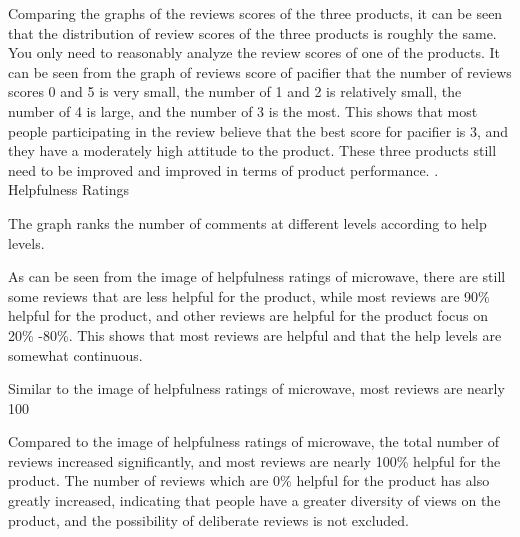 \documentclass[12pt]{article}
\begin{document}
\par
Comparing the graphs of the reviews scores of the three products, it can be seen that the distribution of review scores of the three products is roughly the same. You only need to reasonably analyze the review scores of one of the products. It can be seen from the graph of reviews score of pacifier that the number of reviews scores 0 and 5 is very small, the number of 1 and 2 is relatively small, the number of 4 is large, and the number of 3 is the most. This shows that most people participating in the review believe that the best score for pacifier is 3, and they have a moderately high attitude to the product. These three products still need to be improved and improved in terms of product performance.
. Helpfulness Ratings
\par
The graph ranks the number of comments at different levels according to help levels.
\par
As can be seen from the image of helpfulness ratings of microwave, there are still some reviews that are less helpful for the product, while most reviews are 90\% helpful for the product, and other reviews are helpful for the product focus on 20\% -80\%. This shows that most reviews are helpful and that the help levels are somewhat continuous.
\par
Similar to the image of helpfulness ratings of microwave, most reviews are nearly 100%
\par
\quad\par\quad\par\quad\par\quad\par\quad\par\quad\par\quad\par\quad\par\quad\par\quad\par
\par
Compared to the image of helpfulness ratings of microwave, the total number of reviews increased significantly, and most reviews are nearly 100\% helpful for the product. The number of reviews which are 0\% helpful for the product has also greatly increased, indicating that people have a greater diversity of views on the product, and the possibility of deliberate reviews is not excluded.
\end{document}
